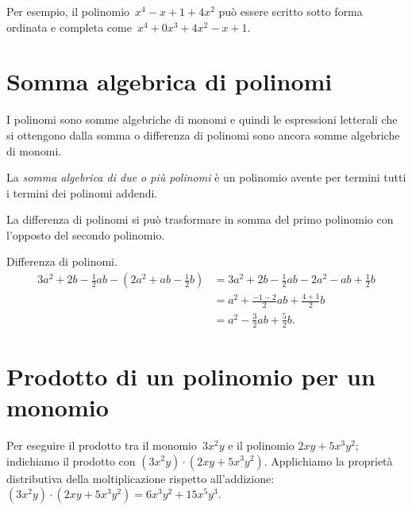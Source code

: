 Per esempio, il polinomio~$x^4−x+1+4x^2$ può essere scritto sotto forma ordinata e completa come~$x^4+0x^3+4x^2−x+1$.

\vspazio{}

\section{Somma algebrica di polinomi}

I polinomi sono somme algebriche di monomi e quindi le espressioni letterali che si ottengono dalla somma
o differenza di polinomi sono ancora somme algebriche di monomi.

\begin{definizione}
La \emph{somma algebrica di due o più polinomi} è un polinomio avente per termini tutti i termini dei polinomi addendi.
\end{definizione}

La differenza di polinomi si può trasformare in somma del primo polinomio con l'opposto del secondo polinomio.

\begin{exrig}
\begin{esempio}
Differenza di polinomi.
\begin{equation*}
\begin{split}
3a^2+2b-\frac{1}{2}ab-\left(2a^2+ab-\frac{1}{2}b\right)&=3a^2+2b-\frac{1}{2}ab-2a^2-ab+\frac{1}{2}b\\
&=a^2+\frac{-1-2}{2}ab+\frac{4+1}{2}b\\
&=a^2-\frac{3}{2}ab+\frac{5}{2}b.
\end{split}
\end{equation*}
\end{esempio}
\end{exrig}

\ovalbox{\risolvii \ref{ese:11.12}, \ref{ese:11.13}, \ref{ese:11.14},\ref{ese:11.15}, \ref{ese:11.16}, \ref{ese:11.17}}

\section{Prodotto di un polinomio per un monomio}

Per eseguire il prodotto tra il monomio~$3x^{2}y$ e il polinomio
$2{xy}+5x^{3}y^{2}$; indichiamo il prodotto con
$\left(3x^{2}y\right)\cdot \left(2{xy}+5x^{3}y^{2}\right)$.
Applichiamo la proprietà distributiva della moltiplicazione rispetto
all'addizione:~$\left(3x^{2}y\right)\cdot
\left(2{xy}+5x^{3}y^{2}\right)=6x^{3}y^{2}+15x^{5}y^{3}$.

